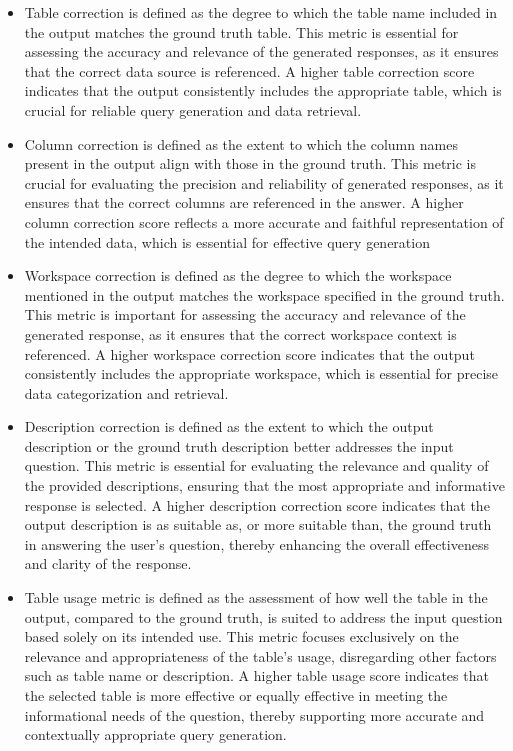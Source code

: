    \begin{itemize}
        \item Table correction is defined as the degree to which the table name included in the output matches the ground truth table. This metric is essential for assessing the accuracy and relevance of the generated responses, as it ensures that the correct data source is referenced. A higher table correction score indicates that the output consistently includes the appropriate table, which is crucial for reliable query generation and data retrieval.
        \item Column correction is defined as the extent to which the column names present in the output align with those in the ground truth. This metric is crucial for evaluating the precision and reliability of generated responses, as it ensures that the correct columns are referenced in the answer. A higher column correction score reflects a more accurate and faithful representation of the intended data, which is essential for effective query generation
        \item Workspace correction is defined as the degree to which the workspace mentioned in the output matches the workspace specified in the ground truth. This metric is important for assessing the accuracy and relevance of the generated response, as it ensures that the correct workspace context is referenced. A higher workspace correction score indicates that the output consistently includes the appropriate workspace, which is essential for precise data categorization and retrieval.
        \item Description correction is defined as the extent to which the output description or the ground truth description better addresses the input question. This metric is essential for evaluating the relevance and quality of the provided descriptions, ensuring that the most appropriate and informative response is selected. A higher description correction score indicates that the output description is as suitable as, or more suitable than, the ground truth in answering the user's question, thereby enhancing the overall effectiveness and clarity of the response.
        \item Table usage metric is defined as the assessment of how well the table in the output, compared to the ground truth, is suited to address the input question based solely on its intended use. This metric focuses exclusively on the relevance and appropriateness of the table’s usage, disregarding other factors such as table name or description. A higher table usage score indicates that the selected table is more effective or equally effective in meeting the informational needs of the question, thereby supporting more accurate and contextually appropriate query generation.
    \end{itemize}

